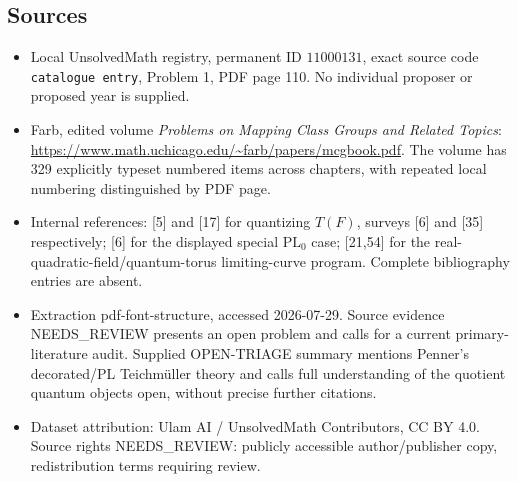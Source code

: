 \documentclass[11pt]{article}
\begin{document}
\subsection{Sources}
\begin{itemize}
\item Local UnsolvedMath registry, permanent ID \(11000131\), exact source code \texttt{catalogue entry}, Problem 1, PDF page 110. No individual proposer or proposed year is supplied.
\item Farb, edited volume \emph{Problems on Mapping Class Groups and Related Topics}: \url{https://www.math.uchicago.edu/~farb/papers/mcgbook.pdf}. The volume has 329 explicitly typeset numbered items across chapters, with repeated local numbering distinguished by PDF page.
\item Internal references: [5] and [17] for quantizing \(T(F)\), surveys [6] and [35] respectively; [6] for the displayed special \(\mathrm{PL}_0\) case; [21,54] for the real-quadratic-field/quantum-torus limiting-curve program. Complete bibliography entries are absent.
\item Extraction pdf-font-structure, accessed 2026-07-29. Source evidence NEEDS\_REVIEW presents an open problem and calls for a current primary-literature audit. Supplied OPEN-TRIAGE summary mentions Penner's decorated/PL Teichmüller theory and calls full understanding of the quotient quantum objects open, without precise further citations.
\item Dataset attribution: Ulam AI / UnsolvedMath Contributors, CC BY 4.0. Source rights NEEDS\_REVIEW: publicly accessible author/publisher copy, redistribution terms requiring review.
\end{itemize}
\end{document}
